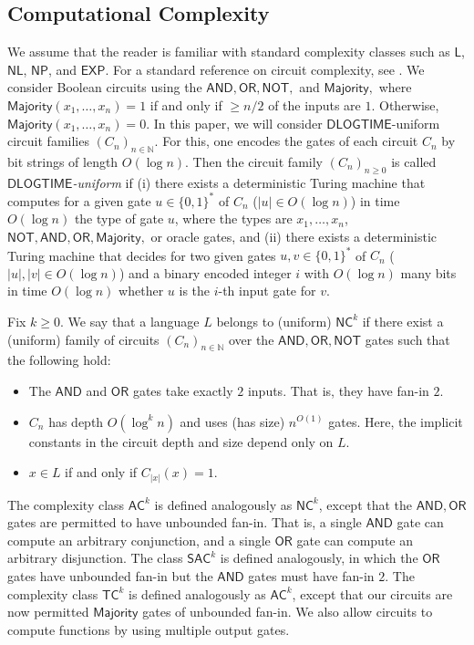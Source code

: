 \documentclass{article}
\newcommand*{\ComplexityClass}[1]{\ensuremath{\mathsf{#1}}\xspace}
\newcommand*{\NL}{\ComplexityClass{NL}}
\newcommand*{\NP}{\ComplexityClass{NP}}
\newcommand*{\EXP}{\ComplexityClass{EXP}}
\newcommand{\AC}{\ComplexityClass{AC}}
\newcommand{\SAC}{\ComplexityClass{SAC}}
\newcommand{\DLOGTIME}{\ComplexityClass{DLOGTIME}} %
\newcommand{\LOGSPACE}{\ComplexityClass{L}} %
\begin{document}
\subsection{Computational Complexity} \label{sec:Complexity}
We assume that the reader is familiar with standard complexity classes such as \LOGSPACE, \NL, \NP, and \EXP. For a standard reference on circuit complexity, see \cite{VollmerText}. We consider Boolean circuits using the $\mathsf{AND}, \mathsf{OR}, \mathsf{NOT},$ and $\mathsf{Majority},$ where $\mathsf{Majority}(x_{1}, \ldots, x_{n}) = 1$ if and only if $\geq n/2$ of the inputs are $1$. Otherwise, $\mathsf{Majority}(x_{1}, \ldots, x_{n}) = 0$. In this paper, we will consider $\mathsf{DLOGTIME}$-uniform circuit families $(C_{n})_{n \in \mathbb{N}}$. For this,
one encodes the gates of each circuit $C_n$ by bit strings of length $O(\log n)$. Then the circuit family $(C_n)_{n \geq 0}$
is called \emph{\DLOGTIME-uniform}  if (i) there exists a deterministic Turing machine that computes for a given gate $u \in \{0,1\}^*$
of $C_n$ ($|u| \in O(\log n)$) in time $O(\log n)$ the type of gate $u$, where the types are $x_1, \ldots, x_n$, $\mathsf{NOT}, \mathsf{AND}, \mathsf{OR}, \mathsf{Majority},$ or oracle gates,
and (ii) there exists a deterministic Turing machine that decides for two given gates $u,v \in \{0,1\}^*$
of $C_n$ ($|u|, |v| \in O(\log n)$) and a binary encoded integer $i$ with $O(\log n)$ many bits
in time $O(\log n)$ whether $u$ is the $i$-th input gate for $v$.


\begin{definition}
Fix $k \geq 0$. We say that a language $L$ belongs to (uniform) $\mathsf{NC}^{k}$ if there exist a (uniform) family of circuits $(C_{n})_{n \in \mathbb{N}}$ over the $\mathsf{AND}, \mathsf{OR}, \mathsf{NOT}$ gates such that the following hold:
\begin{itemize}
\item The $\mathsf{AND}$ and $\mathsf{OR}$ gates take exactly $2$ inputs. That is, they have fan-in $2$.
\item $C_{n}$ has depth $O(\log^{k} n)$ and uses (has size) $n^{O(1)}$ gates. Here, the implicit constants in the circuit depth and size depend only on $L$.

\item $x \in L$ if and only if $C_{|x|}(x) = 1$. 
\end{itemize}
\end{definition}


\noindent The complexity class $\AC^{k}$ is defined analogously as $\mathsf{NC}^{k}$, except that the $\mathsf{AND}, \mathsf{OR}$ gates are permitted to have unbounded fan-in.
That is, a single $\mathsf{AND}$ gate can compute an arbitrary conjunction, and a single $\mathsf{OR}$ gate can compute an arbitrary disjunction. The class $\SAC^k$ is defined analogously, in which the $\mathsf{OR}$ gates have unbounded fan-in but the $\mathsf{AND}$ gates must have fan-in $2$.
The complexity class $\mathsf{TC}^{k}$ is defined analogously as $\AC^{k}$, except that our circuits are now permitted $\mathsf{Majority}$ gates of unbounded fan-in.
We also allow circuits to compute functions by using multiple output gates. 
\end{document}
